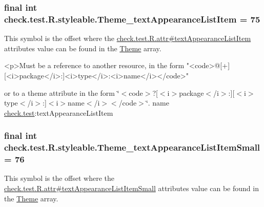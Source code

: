 \subsubsection[{Theme\+\_\+text\+Appearance\+List\+Item}]{\setlength{\rightskip}{0pt plus 5cm}final int check.\+test.\+R.\+styleable.\+Theme\+\_\+text\+Appearance\+List\+Item = 75\hspace{0.3cm}{\ttfamily [static]}}\label{classcheck_1_1test_1_1_r_1_1styleable_a1a1b8a87f2acabee24a7e564989bfbe3}
This symbol is the offset where the \hyperlink{classcheck_1_1test_1_1_r_1_1attr_a0903b5738e5ebb9f752a3eeb9edb6438}{check.\+test.\+R.\+attr\#text\+Appearance\+List\+Item} attribute\textquotesingle{}s value can be found in the \hyperlink{classcheck_1_1test_1_1_r_1_1styleable_acca726d02016a0cf607782ec3a436a81}{Theme} array.

\begin{DoxyVerb}      <p>Must be a reference to another resource, in the form "<code>@[+][<i>package</i>:]<i>type</i>:<i>name</i></code>"
\end{DoxyVerb}
 or to a theme attribute in the form \char`\"{}$<$code$>$?\mbox{[}$<$i$>$package$<$/i$>$\+:\mbox{]}\mbox{[}$<$i$>$type$<$/i$>$\+:\mbox{]}$<$i$>$name$<$/i$>$$<$/code$>$\char`\"{}.  name \hyperlink{namespacecheck_1_1test}{check.\+test}\+:text\+Appearance\+List\+Item \hypertarget{classcheck_1_1test_1_1_r_1_1styleable_abe557b2f9da24355df498eac97be2c53}{}
\subsubsection[{Theme\+\_\+text\+Appearance\+List\+Item\+Small}]{\setlength{\rightskip}{0pt plus 5cm}final int check.\+test.\+R.\+styleable.\+Theme\+\_\+text\+Appearance\+List\+Item\+Small = 76\hspace{0.3cm}{\ttfamily [static]}}\label{classcheck_1_1test_1_1_r_1_1styleable_abe557b2f9da24355df498eac97be2c53}
This symbol is the offset where the \hyperlink{classcheck_1_1test_1_1_r_1_1attr_a207e3b80940457620df45d83ed20ab6d}{check.\+test.\+R.\+attr\#text\+Appearance\+List\+Item\+Small} attribute\textquotesingle{}s value can be found in the \hyperlink{classcheck_1_1test_1_1_r_1_1styleable_acca726d02016a0cf607782ec3a436a81}{Theme} array.

